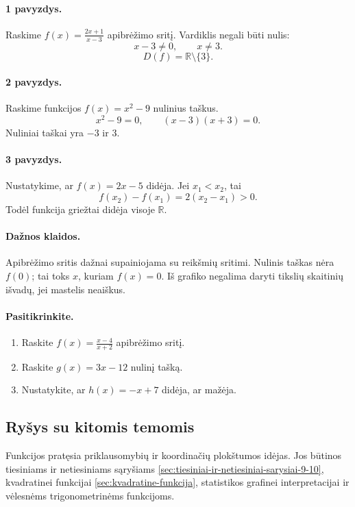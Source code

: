\paragraph{1 pavyzdys.}
Raskime $f(x)=\frac{2x+1}{x-3}$ apibrėžimo sritį. Vardiklis negali būti nulis:
\[
x-3\ne0,\qquad x\ne3.
\]
\[
D(f)=\mathbb{R}\setminus\{3\}.
\]

\paragraph{2 pavyzdys.}
Raskime funkcijos $f(x)=x^2-9$ nulinius taškus.
\[
x^2-9=0,\qquad (x-3)(x+3)=0.
\]
Nuliniai taškai yra $-3$ ir $3$.

\paragraph{3 pavyzdys.}
Nustatykime, ar $f(x)=2x-5$ didėja.
Jei $x_1<x_2$, tai
\[
f(x_2)-f(x_1)=2(x_2-x_1)>0.
\]
Todėl funkcija griežtai didėja visoje $\mathbb{R}$.

\paragraph{Dažnos klaidos.}
Apibrėžimo sritis dažnai supainiojama su reikšmių sritimi. Nulinis taškas nėra $f(0)$; tai toks $x$, kuriam $f(x)=0$. Iš grafiko negalima daryti tikslių skaitinių išvadų, jei mastelis neaiškus.

\paragraph{Pasitikrinkite.}
\begin{enumerate}
\item Raskite $f(x)=\frac{x-4}{x+2}$ apibrėžimo sritį.
\item Raskite $g(x)=3x-12$ nulinį tašką.
\item Nustatykite, ar $h(x)=-x+7$ didėja, ar mažėja.
\end{enumerate}

\subsection{Ryšys su kitomis temomis}

Funkcijos pratęsia priklausomybių ir koordinačių plokštumos idėjas. Jos būtinos tiesiniams ir netiesiniams sąryšiams \ref{sec:tiesiniai-ir-netiesiniai-sarysiai-9-10}, kvadratinei funkcijai \ref{sec:kvadratine-funkcija}, statistikos grafinei interpretacijai ir vėlesnėms trigonometrinėms funkcijoms.

